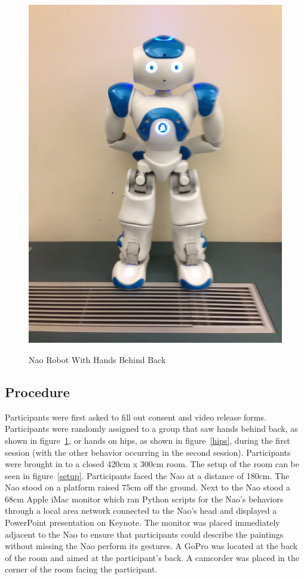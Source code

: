 \documentclass{acm_proc_article-sp}
\begin{document}
\begin{figure}[t!]
\centering
 \includegraphics[width=0.65\linewidth]{images/behind3.jpg}\\
 \caption{Nao Robot With Hands Behind Back}
 \label{behind} %
\end{figure}

\subsection{Procedure}
Participants were first asked to fill out consent and video release forms. Participants were randomly assigned to a group that saw hands behind back, as shown in figure~\ref{behind}, or hands on hips, as shown in figure~\ref{hips}, during the first session (with the other behavior occurring in the second session). Participants were brought in to a closed 420cm x 300cm room. The setup of the room can be seen in figure~\ref{setup}. Participants faced the Nao at a distance of 180cm. The Nao stood on a platform raised 75cm off the ground. Next to the Nao stood a 68cm Apple iMac monitor which ran Python scripts for the Nao's behaviors through a local area network connected to the Nao's head and displayed a PowerPoint presentation on Keynote. The monitor was placed immediately adjacent to the Nao to ensure that participants could describe the paintings without missing the Nao perform its gestures. A GoPro was located at the back of the room and aimed at the participant's back. A camcorder was placed in the corner of the room facing the participant.
\end{document}

